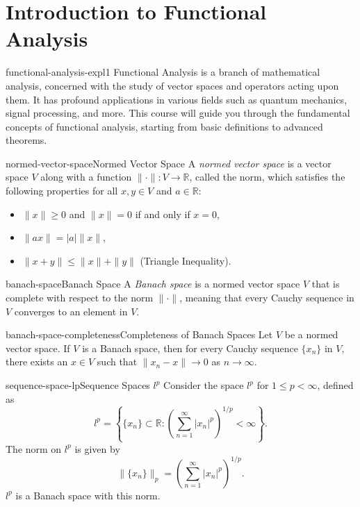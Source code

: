 \documentclass[preview]{standalone}
\begin{document}
\genpage

\section{Introduction to Functional Analysis}

\begin{snippet}{functional-analysis-expl1}
    Functional Analysis is a branch of mathematical analysis, concerned with the study of vector spaces and operators acting upon them. It has profound applications in various fields such as quantum mechanics, signal processing, and more. This course will guide you through the fundamental concepts of functional analysis, starting from basic definitions to advanced theorems.
\end{snippet}

\begin{snippetdefinition}{normed-vector-space}{Normed Vector Space}
    A \textit{normed vector space} is a vector space \(V\) along with a function \(\|\cdot\|: V \to \mathbb{R}\), called the norm, which satisfies the following properties for all \(x, y \in V\) and \(a \in \mathbb{R}\):
    \begin{itemize}
        \item \(\|x\| \geq 0\) and \(\|x\| = 0\) if and only if \(x = 0\),
        \item \(\|ax\| = |a|\|x\|\),
        \item \(\|x + y\| \leq \|x\| + \|y\|\) (Triangle Inequality).
    \end{itemize}
\end{snippetdefinition}

\begin{snippetdefinition}{banach-space}{Banach Space}
    A \textit{Banach space} is a normed vector space \(V\) that is complete with respect to the norm \(\|\cdot\|\), meaning that every Cauchy sequence in \(V\) converges to an element in \(V\).
\end{snippetdefinition}

\begin{snippettheorem}{banach-space-completeness}{Completeness of Banach Spaces}
    Let \(V\) be a normed vector space. If \(V\) is a Banach space, then for every Cauchy sequence \(\{x_n\}\) in \(V\), there exists an \(x \in V\) such that \(\|x_n - x\| \to 0\) as \(n \to \infty\).
\end{snippettheorem}

\begin{snippetexample}{sequence-space-lp}{Sequence Spaces \(l^p\)}
    Consider the space \(l^p\) for \(1 \leq p < \infty\), defined as
    \[
        l^p = \left\{ \{x_n\} \subset \mathbb{R} : \left( \sum_{n=1}^{\infty} |x_n|^p \right)^{1/p} < \infty \right\}.
    \]
    The norm on \(l^p\) is given by
    \[
        \|\{x_n\}\|_p = \left( \sum_{n=1}^{\infty} |x_n|^p \right)^{1/p}.
    \]
    \(l^p\) is a Banach space with this norm.
\end{snippetexample}
\end{document}
